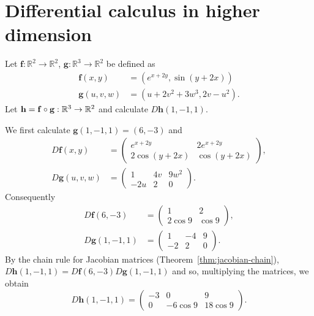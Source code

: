 \section{Differential calculus in higher dimension}

\begin{task}
    Let $\mathbf{f}:\mathbb{R}^2\to\mathbb{R}^2$, $\mathbf{g}:\mathbb{R}^3\to\mathbb{R}^2$ be defined as
    \[
        \begin{aligned}
            \mathbf{f}(x,y)   & = (e^{x+2y}, \sin(y+2x)) \\
            \mathbf{g}(u,v,w) & = (u+2v^2+3w^3,2v-u^2).
        \end{aligned}
    \]
    Let $\mathbf{h} =\mathbf{f} \circ \mathbf{g} : \mathbb{R}^3 \to \mathbb{R}^2$ and calculate \(D\mathbf{h}(1,-1,1)\).
\end{task}

\begin{solution}
    We first calculate \(\mathbf{g}(1,-1,1) = (6,-3)\) and
    \[
        \begin{aligned}
            D\mathbf{f}(x,y)   & =
            \begin{pmatrix}
                e^{x+2y}     & 2 e^{x+2y} \\
                2 \cos(y+2x) & \cos(y+2x)
            \end{pmatrix}, \\
            D\mathbf{g}(u,v,w) & =
            \begin{pmatrix}
                1   & 4v & 9w^2 \\
                -2u & 2  & 0
            \end{pmatrix}.
        \end{aligned}
    \]
    Consequently
    \[
        \begin{aligned}
            D\mathbf{f}(6,-3)   & =
            \begin{pmatrix}
                1        & 2      \\
                2 \cos 9 & \cos 9
            \end{pmatrix}, \\
            D\mathbf{g}(1,-1,1) & =
            \begin{pmatrix}
                1  & -4 & 9 \\
                -2 & 2  & 0
            \end{pmatrix}.
        \end{aligned}
    \]
    By the chain rule for Jacobian matrices (Theorem~\ref{thm:jacobian-chain}),
    \( D\mathbf{h}(1,-1,1) = D\mathbf{f}(6,-3)  D\mathbf{g}(1,-1,1) \)
    and so, multiplying the matrices, we obtain
    $$D\mathbf{h}(1,-1,1) =
        \begin{pmatrix}
            -3 & 0        & 9        \\
            0  & -6\cos 9 & 18\cos 9
        \end{pmatrix}.
    $$
\end{solution}


